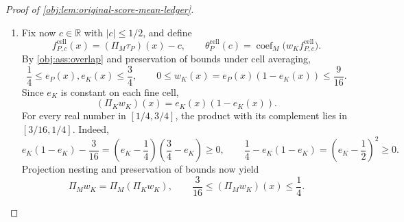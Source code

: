 \documentclass[11pt]{article}
\begin{document}
\begin{proof}[Proof of \cref{obj:lem:original-score-mean-ledger}]
\begin{enumerate}
For each increment, self-adjointness at its two ranks gives
\[
\operatorname{coef}_M(e_PD_jr_{T_j})
=
\operatorname{coef}_M\bigl((D_je_P)r_{T_j}\bigr).
\]
The propensity Hölder estimate and \(R_j=2R_{j-1}\) imply
\[
\begin{aligned}
|D_je_P|
&\le |e_P-\Pi_{R_j}e_P|
+|e_P-\Pi_{R_{j-1}}e_P|\\
&\le20R_j^{-\alpha}+20R_{j-1}^{-\alpha}
\le40R_{j-1}^{-\alpha}
=a_j.
\end{aligned}
\]
Together with the pooled tail bound, this gives
\[
|(D_je_P)r_{T_j}|
\le10a_jT_j^{1-p}\quad\text{almost everywhere},
\qquad
\|\operatorname{coef}_M(e_PD_jr_{T_j})\|_2
\le10a_jT_j^{1-p}.
\]
Hence the complete tail vector satisfies
\[
\left\|
\theta^{\mathrm{tail}}_{P,M}(T_0)
+\sum_{j=1}^L\operatorname{coef}_M(e_PD_jr_{T_j})
\right\|_2
\le
20T_0^{1-p}
+10\sum_{j=1}^La_jT_j^{1-p}.
\]
Combining this with the original-mean error bound proves
\[
\|\theta_P(c)-\theta^{\mathrm{wt}}_P(c)\|_2
\le
400K^{-S}+20T_0^{1-p}
+10\sum_{j=1}^La_jT_j^{1-p}
=B.
\]
When \(L=0\), \(K=M\), both increment sums are empty, and the same identities reduce to the single correction at rank \(M\). Thus, in either branch, we have established for every real \(c\)
\[
\left\|
\theta_P(c)
-
\int_0^1w_K(x)(\tau_P(x)-c)F_M(x)\,d\lambda(x)
\right\|_2
\le B.
\]

\item
Fix now \(c\in\mathbb R\) with \(|c|\le1/2\), and define
\[
f^{\mathrm{cell}}_{P,c}(x)
=
(\Pi_M\tau_P)(x)-c,
\qquad
\theta^{\mathrm{cell}}_P(c)
=
\operatorname{coef}_M\bigl(w_Kf^{\mathrm{cell}}_{P,c}\bigr).
\]
By \cref{obj:ass:overlap} and preservation of bounds under cell averaging,
\[
\frac14\le e_P(x),e_K(x)\le\frac34,
\qquad
0\le w_K(x)=e_P(x)(1-e_K(x))\le\frac9{16}.
\]
Since \(e_K\) is constant on each fine cell,
\[
(\Pi_Kw_K)(x)=e_K(x)(1-e_K(x)).
\]
For every real number in \([1/4,3/4]\), the product with its complement lies in \([3/16,1/4]\). Indeed,
\[
e_K(1-e_K)-\frac3{16}
=
\left(e_K-\frac14\right)\left(\frac34-e_K\right)\ge0,
\qquad
\frac14-e_K(1-e_K)
=
\left(e_K-\frac12\right)^2\ge0.
\]
Projection nesting and preservation of bounds now yield
\[
\Pi_Mw_K=\Pi_M(\Pi_Kw_K),
\qquad
\frac3{16}\le(\Pi_Mw_K)(x)\le\frac14.
\]


\end{enumerate}
\end{proof}
\end{document}
